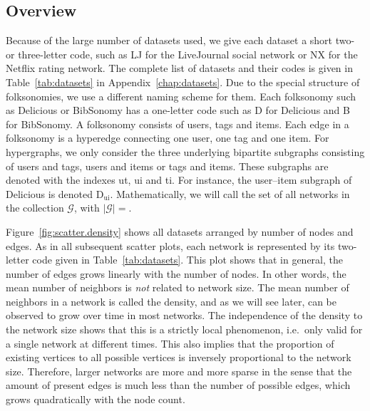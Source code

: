 \documentclass[11pt,a4paper]{book}
\begin{document}
\subsection{Overview}
\label{sec:network-collection:overview}
Because of the large number of datasets used, we give each dataset a
short two- or three-letter code, such as \textsf{LJ} for the LiveJournal social
network or \textsf{NX} for the Netflix rating network. The complete list
of datasets and their codes is given in Table~\ref{tab:datasets} in
Appendix~\ref{chap:datasets}.  Due to the special structure of
folksonomies, we use a different naming scheme for them.  Each
folksonomy such as Delicious or BibSonomy has a one-letter code such as
\textsf D for Delicious and \textsf B for BibSonomy.
A folksonomy consists of users, tags and
items. Each edge in a folksonomy is a hyperedge connecting one user, one
tag and one item.  For hypergraphs, we only consider the three underlying bipartite
subgraphs consisting of users and tags, users and items or tags and
items.  These subgraphs are denoted with the indexes \textrm{ut},
\textrm{ui} and \textrm{ti}. For instance, the user--item subgraph of
Delicious is denoted \textsf{D}$_\textrm{ui}$. 
Mathematically, we will call the set of all networks in the collection
$\mathcal G$, with $|\mathcal G| = $.

Figure~\ref{fig:scatter.density} shows all
datasets arranged by number of nodes and edges.  As in all
subsequent 
scatter plots, each network is represented by its two-letter code given
in Table~\ref{tab:datasets}.  
This plot shows that in general, the number of edges grows
linearly with the number of nodes.  In other words, the mean number of
neighbors is \emph{not} related to network size.  The mean number of
neighbors in a network is called the density, and as we will see later,
can be observed to grow over time in most networks.  The independence of
the density to the network size shows that this is a strictly local
phenomenon, i.e.\ only valid for a single network at different times.
This also implies that the proportion of existing vertices to all
possible vertices is inversely proportional to the network size.
Therefore, larger networks are more and more sparse in the sense that
the amount of present edges is much less than the number of possible
edges, which grows quadratically with the node count.
\end{document}
